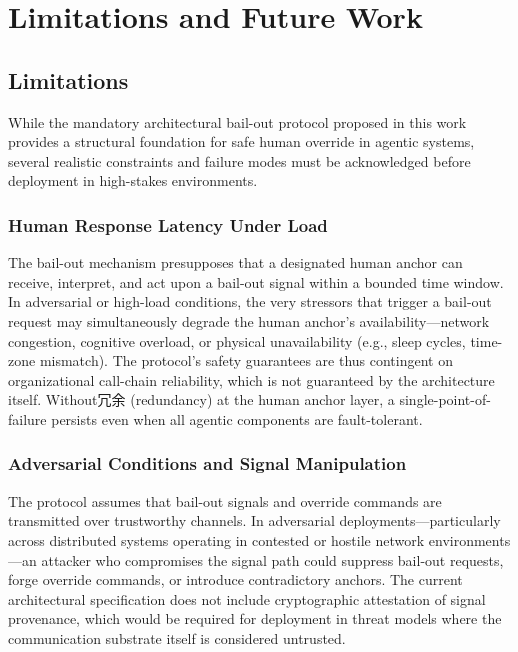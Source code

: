\section{Limitations and Future Work}\label{sec:limitations}

\subsection{Limitations}\label{sub:limitations}

While the mandatory architectural bail-out protocol proposed in this work provides a structural foundation for safe human override in agentic systems, several realistic constraints and failure modes must be acknowledged before deployment in high-stakes environments.

\subsubsection{Human Response Latency Under Load}\label{ssub:human_latency}
The bail-out mechanism presupposes that a designated human anchor can receive, interpret, and act upon a bail-out signal within a bounded time window. In adversarial or high-load conditions, the very stressors that trigger a bail-out request may simultaneously degrade the human anchor's availability—network congestion, cognitive overload, or physical unavailability (e.g., sleep cycles, time-zone mismatch). The protocol's safety guarantees are thus contingent on organizational call-chain reliability, which is not guaranteed by the architecture itself. Without冗余 (redundancy) at the human anchor layer, a single-point-of-failure persists even when all agentic components are fault-tolerant.

\subsubsection{Adversarial Conditions and Signal Manipulation}\label{ssub:adversarial}
The protocol assumes that bail-out signals and override commands are transmitted over trustworthy channels. In adversarial deployments—particularly across distributed systems operating in contested or hostile network environments—an attacker who compromises the signal path could suppress bail-out requests, forge override commands, or introduce contradictory anchors. The current architectural specification does not include cryptographic attestation of signal provenance, which would be required for deployment in threat models where the communication substrate itself is considered untrusted.

